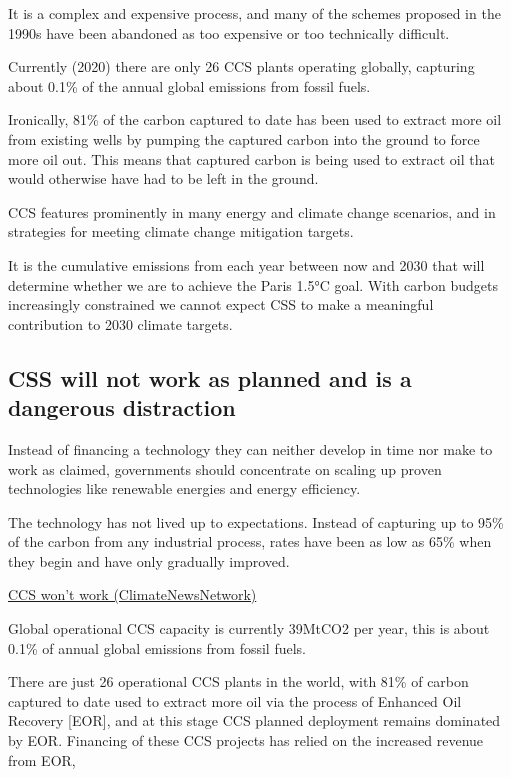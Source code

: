 \documentclass[
]{book}
\begin{document}
It is a complex and expensive process, and many of the schemes proposed in the 1990s
have been abandoned as too expensive or too technically difficult.

Currently (2020) there are only 26 CCS plants operating globally,
capturing about 0.1\% of the annual global emissions from fossil fuels.

Ironically, 81\% of the carbon captured to date has been used to
extract more oil from existing wells by pumping the captured carbon into the ground
to force more oil out.
This means that captured carbon is being used to extract oil that
would otherwise have had to be left in the ground.

CCS features prominently in many energy and climate change scenarios,
and in strategies for meeting climate change mitigation targets.

It is the cumulative emissions from each year between now and 2030 that will
determine whether we are to achieve the Paris 1.5°C goal.
With carbon budgets increasingly constrained we cannot expect
CSS to make a meaningful contribution to 2030 climate targets.

\hypertarget{css-will-not-work-as-planned-and-is-a-dangerous-distraction}{%
\subsection{CSS will not work as planned and is a dangerous distraction}\label{css-will-not-work-as-planned-and-is-a-dangerous-distraction}}

Instead of financing a technology they can neither develop in time
nor make to work as claimed,
governments should concentrate on scaling up proven technologies
like renewable energies and energy efficiency.

The technology has not lived up to expectations.
Instead of capturing up to 95\% of the carbon from any industrial process,
rates have been as low as 65\% when they begin and have only gradually improved.

\href{https://climatenewsnetwork.net/carbon-capture-and-storage-wont-work-critics-say/}{CCS won't work (ClimateNewsNetwork)}

Global operational CCS capacity is currently 39MtCO2 per year,
this is about 0.1\% of annual global emissions from fossil fuels.

There are just 26 operational CCS plants in the world,
with 81\% of carbon captured to date used to extract more oil
via the process of Enhanced Oil Recovery {[}EOR{]}, and at this stage
CCS planned deployment remains dominated by EOR.
Financing of these CCS projects has relied on the increased revenue from EOR,
\end{document}

